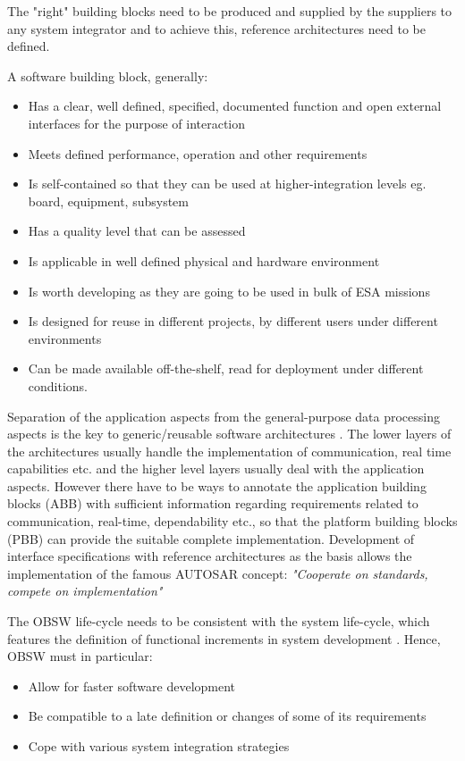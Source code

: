The "right" building blocks need to be produced and supplied by the suppliers to any system integrator and to achieve this, reference architectures need to be defined.

A software building block, generally:
\begin{itemize}
\item Has a clear, well defined, specified, documented function and open external interfaces for the purpose of interaction
\item Meets defined performance, operation and other requirements
\item Is self-contained so that they can be used at higher-integration levels eg. board, equipment, subsystem 
\item Has a quality level that can be assessed
\item Is applicable in well defined physical and hardware environment
\item Is worth developing as they are going to be used in bulk of ESA missions
\item Is designed for reuse in different projects, by different users under different environments
\item Can be made available off-the-shelf, read for deployment under different conditions.  
\end{itemize}

Separation of the application aspects from the general-purpose data processing aspects is the key to generic/reusable software architectures \cite{PhdThesis}. The lower layers of the architectures usually handle the implementation of communication, real time capabilities etc. and the higher level layers usually deal with the application aspects. However there have to be ways to annotate the application building blocks (ABB) with sufficient information regarding requirements related to communication, real-time, dependability etc., so that the platform building blocks (PBB) can provide the suitable complete implementation. Development of interface specifications with reference architectures as the basis allows the implementation of the famous AUTOSAR concept: \textit{"Cooperate on standards, compete on implementation"}\cite{AUTOSARurl}

The OBSW life-cycle needs to be consistent with the system life-cycle, which features the definition of functional increments in system development \cite{SAVOIR}. Hence, OBSW must in particular:

\begin{itemize}
\item Allow for faster software development
\item Be compatible to a late definition or changes of some of its requirements
\item Cope with various system integration strategies
\end{itemize}

